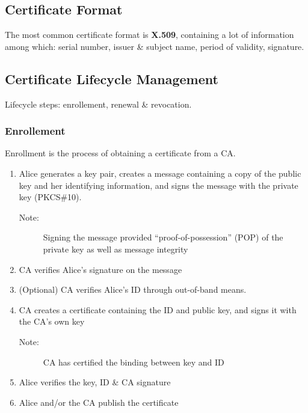 \subsection{Certificate Format}
\begin{center}
\end{center}
The most common certificate format is \textbf{X.509}, containing a lot of information among which: serial number, issuer \& subject name, period of validity, signature.

\subsection{Certificate Lifecycle Management}
Lifecycle steps: enrollement, renewal \& revocation.
\subsubsection{Enrollement}
Enrollment is the process of obtaining a certificate from a CA.
\begin{enumerate}
    \item Alice generates a key pair, creates a message containing a copy of the public key and her identifying information, and signs the message with the private key (PKCS\#10).
    \begin{description}
    \item[Note:]Signing the message provided “proof-of-possession” (POP) of the private key as well as message integrity
    \end{description}
    \item CA verifies Alice’s signature on the message
    \item (Optional) CA verifies Alice’s ID through out-of-band means.
    \item CA creates a certificate containing the ID and public key, and signs it with the CA’s own key
    \begin{description}
    \item[Note:]CA has certified the binding between key and ID
    \end{description}
    \item Alice verifies the key, ID \& CA signature
    \item Alice and/or the CA publish the certificate
\end{enumerate}
